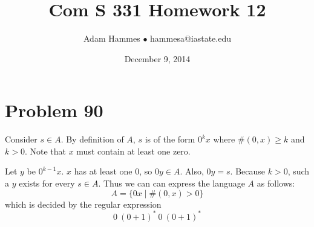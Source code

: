 \documentclass[11pt]{article}
\begin{document}
\title{Com S 331 Homework 12}
\author{Adam Hammes $\bullet$ hammesa@iastate.edu}
\date{December 9, 2014}
\maketitle


\section*{Problem 90}

Consider $s \in A$.
By definition of $A$, $s$ is of the form $0^kx$ where $\#(0,x) \geq k$ and $k>0$.
Note that $x$ must contain at least one zero.

Let $y$ be $0^{k-1}x$. $x$ has at least one 0, so $0y \in A$.
Also, $0y = s$.
Because $k >0$, such a $y$ exists for every $s \in A$.
Thus we can can express the language $A$ as follows:
	\[ A = \{0x \mid \#(0,x) > 0 \}\]
which is decided by the regular expression
	\[ 0\ (0+1)^*\ 0\ (0+1)^*\]
\end{document}

